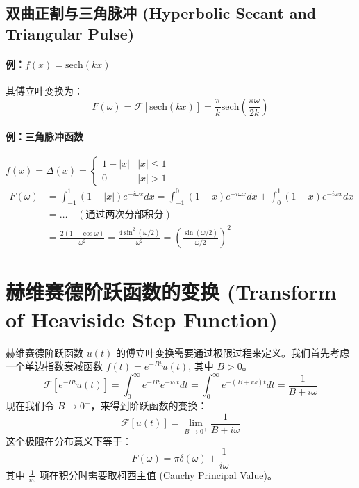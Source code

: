 \documentclass{article}
\begin{document}
	\subsection{双曲正割与三角脉冲 (Hyperbolic Secant and Triangular Pulse)}
	
	\paragraph{例：$f(x) = \text{sech}(kx)$}
	其傅立叶变换为：
	$$ 
	F(\omega) = \mathcal{F}[\text{sech}(kx)] = \frac{\pi}{k} \text{sech}\left(\frac{\pi\omega}{2k}\right) 
	$$
	
	\paragraph{例：三角脉冲函数}
	$f(x) = \Delta(x) = \begin{cases} 1-|x| & |x| \le 1 \\ 0 & |x| > 1 \end{cases}$
	\begin{align*}
		F(\omega) &= \int_{-1}^{1} (1-|x|) e^{-i\omega x} dx = \int_{-1}^{0} (1+x)e^{-i\omega x}dx + \int_{0}^{1} (1-x)e^{-i\omega x}dx \\
		&= \dots \quad (\text{通过两次分部积分}) \\
		&= \frac{2(1-\cos\omega)}{\omega^2} = \frac{4\sin^2(\omega/2)}{\omega^2} = \left(\frac{\sin(\omega/2)}{\omega/2}\right)^2
	\end{align*}
	
	\section{赫维赛德阶跃函数的变换 (Transform of Heaviside Step Function)}
	赫维赛德阶跃函数 $u(t)$ 的傅立叶变换需要通过极限过程来定义。我们首先考虑一个单边指数衰减函数 $f(t) = e^{-Bt}u(t)$, 其中 $B>0$。
	$$ 
	\mathcal{F}[e^{-Bt}u(t)] = \int_0^{\infty} e^{-Bt} e^{-i\omega t} dt = \int_0^{\infty} e^{-(B+i\omega)t} dt = \frac{1}{B+i\omega} 
	$$
	现在我们令 $B \to 0^+$，来得到阶跃函数的变换：
	$$ 
	\mathcal{F}[u(t)] = \lim_{B\to 0^+} \frac{1}{B+i\omega} 
	$$
	这个极限在分布意义下等于：
	$$ 
	F(\omega) = \pi\delta(\omega) + \frac{1}{i\omega} 
	$$
	其中 $\frac{1}{i\omega}$ 项在积分时需要取柯西主值 (Cauchy Principal Value)。
	
\end{document}
